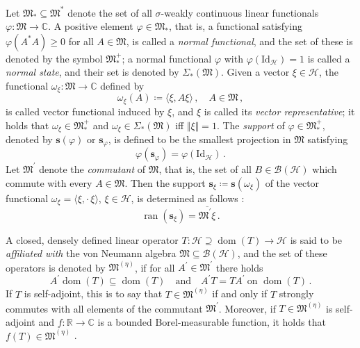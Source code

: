 \documentclass[a4paper, twoside, 11pt, reqno]{amsart}
\theoremstyle{definition}
\theoremstyle{plain}
\renewcommand{\subset}{\subseteq}
\renewcommand{\supset}{\supseteq}
\renewcommand{\Sigma}{\varSigma}
\newcommand{\R}{\mathbb{R}}
\newcommand{\C}{\mathbb{C}}
\newcommand{\MH}{\mathcal{H}}
\newcommand{\MFM}{\mathfrak{M}}
\newcommand{\BO}{\mathscr{B}}
\newcommand{\comm}[1]{#1^{\prime}}
\newcommand{\NF}[1]{#1_{\ast}^{+}}
\newcommand{\NS}[1]{\Sigma_{\ast}(#1)}
\renewcommand{\AE}[1]{#1^{(\eta)}}
\newcommand{\id}{\mathrm{Id}}
\newcommand{\1}{\mathbf{1}}
\newcommand{\ssupp}{\mathbf{s}}
\DeclareMathOperator{\dom}{dom}
\DeclareMathOperator{\ran}{ran}
\newcommand{\norm}[2][]{#1\Vert{#2}#1\Vert}
\newcommand{\braket}[2][]{#1\langle{#2}#1\rangle}
\newcommand{\ce}{\coloneqq}
\newcommand{\oln}[1]{\overline{#1}}
\newcommand{\tand}{\quad\text{and}\quad}
\newcommand{\com}{{\, , \quad}}
\begin{document}
Let $\MFM_\ast \subset \MFM^\ast$ denote the set of all $\sigma$-weakly continuous linear functionals $\varphi : \MFM \to \C$. A positive element $\varphi \in \MFM_\ast$, that is, a functional satisfying $\varphi(A^\ast A) \ge 0$ for all $A \in \MFM$, is called a \emph{normal functional}, and the set of these is denoted by the symbol $\NF{\MFM}$; a normal functional $\varphi$ with $\varphi(\id_\MH) = 1$ is called a \emph{normal state}, and their set is denoted by $\NS{\MFM}$. Given a vector $\xi \in \MH$, the functional $\omega_\xi : \MFM \to \C$ defined by
\begin{equation*}
    \omega_\xi(A) \ce \braket{\xi, A \xi} \com A \in \MFM \, ,
\end{equation*}
is called vector functional induced by $\xi$, and $\xi$ is called its \emph{vector representative}; it holds that $\omega_\xi \in \NF{\MFM}$ and $\omega_\xi \in \NS{\MFM}$ iff $\norm{\xi} = 1$. The \emph{support} of $\varphi \in \NF{\MFM}$, denoted by $\ssupp(\varphi)$ or $\ssupp_\varphi$, is defined to be the smallest projection in $\MFM$ satisfying
\begin{equation*}
    \varphi (\ssupp_\varphi) = \varphi(\id_\MH) \, .
\end{equation*}
Let $\comm{\MFM}$ denote the \emph{commutant} of $\MFM$, that is, the set of all $B \in \BO(\MH)$ which commute with every $A \in \MFM$. Then the support $\ssupp_\xi \ce \ssupp(\omega_\xi)$ of the vector functional $\omega_\xi = \braket{\xi, \cdot\, \xi}$, $\xi \in \MH$, is determined as follows \cite[Sect. 5.22]{StratilaZsido2019}:
\begin{equation*}
    \ran (\ssupp_\xi) = \oln{\comm{\MFM} \xi} \, .
\end{equation*}

A closed, densely defined linear operator $T : \MH \supset \dom(T) \to \MH$ is said to be \emph{affiliated with} the von Neumann algebra $\MFM \subset \BO(\MH)$, and the set of these operators is denoted by $\AE{\MFM}$, if for all $A^\prime \in \comm{\MFM}$ there holds
\begin{equation*}
    A^\prime \dom(T) \subset \dom(T) \tand A^\prime T = T A^\prime \ \text{on $\dom(T)$} \, .
\end{equation*}
If $T$ is self-adjoint, this is to say that $T \in \AE{\MFM}$ if and only if $T$ strongly commutes with all elements of the commutant $\comm{\MFM}$. Moreover, if $T \in \AE{\MFM}$ is self-adjoint and $f : \R \to \C$ is a bounded Borel-measurable function, it holds that $f(T) \in \AE{\MFM}$ \cite[p. 226]{StratilaZsido2019}.
\end{document}
